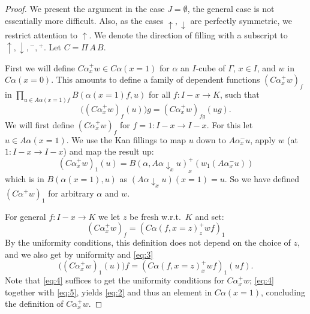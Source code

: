 \documentclass[a4paper,USenglish,draft]{lipics}
\newcommand{\es}{\emptyset}
\newcommand{\rup}[1]{#1{\uparrow}}
\newcommand{\rdo}[1]{#1{\downarrow}}
\begin{document}
\begin{proof}
  We present the argument in the case $J=\es$, the general case is not
  essentially more difficult.  Also, as the cases $\rup{},\rdo{}$ are
  perfectly symmetric, we restrict attention to $\rup{}$.  We denote
  the direction of filling with a subscript to $\rup{}, \rdo{}, {}^-,
  {}^+$.  Let $C = \Pi\,A\,B$.

  First we will define ${C \alpha}^+_x w \in C \alpha (x = 1)$ for
  $\alpha$ an $I$-cube of $\Gamma$, $x \in I$, and $w$ in $C \alpha (x
  = 0)$.  This amounts to define a family of dependent functions $({C
    \alpha}^+_x w)_f$ in $\prod_{u \in A \alpha (x=1) f} B (\alpha
  (x=1) f, u)$ for all $f \colon I-x \to K$, such that
  \begin{equation}
    \label{eq:2}
    \bigl(({C \alpha}^+_x w)_f (u)\bigl) g = ({C \alpha}^+_x w)_{f g}
    (u g).
  \end{equation}
  We will first define $({C \alpha}^+_x w)_f$ for $f = 1 \colon I-x
  \to I-x$.  For this let $u \in A \alpha (x=1)$.  We use the Kan
  fillings to map $u$ down to $A\alpha^-_xu$, apply $w$ (at $1 \colon
  I-x \to I-x$) and map the result up:
  \begin{equation}
    \label{eq:3}
    ({C \alpha}^+_x w)_1 (u) =
    B(\alpha,\rdo{A\alpha}_x u)^+_x (w_1 (A\alpha^-_x u))
  \end{equation}
  which is in $B (\alpha (x=1), u)$ as $(\rdo{A\alpha}_x u) (x=1) =
  u$. So we have defined $({C \alpha}^+ w)_1$ for arbitrary $\alpha$
  and $w$.

  For general $f \colon I-x \to K$ we let $z$ be fresh
  w.r.t.\ $K$ and set:
  \begin{equation}
    \label{eq:4}
    ({C \alpha}^+_x w)_f = ({C \alpha (f, x=z)}^+_z w f)_1
  \end{equation}
  By the uniformity conditions, this definition does not depend on the
  choice of $z$, and we also get by uniformity and \eqref{eq:3}
  \begin{equation}
    \label{eq:5}
    \bigl(({C \alpha}^+_x w)_1 (u)\bigr) f = ({C \alpha (f,x=z)}^+_x
    w f)_1 (u f).
  \end{equation}
  Note that \eqref{eq:4} suffices to get the uniformity conditions for
  ${C \alpha}^+_x w$; \eqref{eq:4} together with \eqref{eq:5}, yields
  \eqref{eq:2} and thus an element in $C \alpha (x=1)$, concluding the
  definition of ${C \alpha}^+_x w$.


\end{proof}
\end{document}
